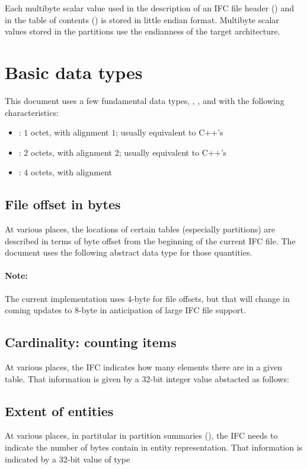 Each multibyte scalar value used in the description of an IFC file header ()
and in the table of contents ()
is stored in little endian format. Multibyte scalar values stored in the partitions use the
endianness of the target architecture.

\section{Basic data types}
\label{sec:ifc-basic-data-types}

This document uses a few fundamental data types, , , and  with the following characteristics:
\begin{itemize}
	\item {}: $1$ octet, with alignment $1$; usually equivalent to C++'s 
	\item {}: $2$ octets, with alignment $2$; usually equivalent to C++'s 
	\item {}: $4$ octets, with alignment %
\end{itemize} 

\subsection{File offset in bytes}
At various places, the locations of certain tables (especially partitions) are
described in terms of byte offset from the beginning of the current IFC file.  The
document uses the following abstract data type for those quantities.

\paragraph{Note:}
The current implementation uses 4-byte for file offsets, but that will change
in coming updates to 8-byte in anticipation of large IFC file support.

\subsection{Cardinality: counting items}
At various places, the IFC indicates how many elements there are in a given
table.  That information is given by a 32-bit integer value abstacted as
follows: 

\subsection{Extent of entities}
\label{sec:ifc-entity-size}
At various places, in partitular in partition summaries (), the IFC needs to indicate 
the number of bytes contain in entity representation.  That information is
indicated by a 32-bit value of type 


